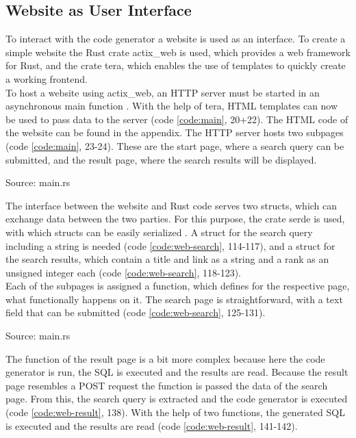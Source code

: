 \subsection{Website as User Interface}
To interact with the code generator a website is used as an interface. To create a simple website the Rust crate actix\_web is used, which provides a web framework for Rust, and the crate tera, which enables the use of templates to quickly create a working frontend.\\
To host a website using actix\_web, an HTTP server must be started in an asynchronous main function \parencite[cf.][n.p.]{ede_actix_2022}. With the help of tera, HTML templates can now be used \parencite[cf.][n.p.]{prouillet_tera_2022} to pass data to the server (code \ref{code:main}, 20+22). The HTML code of the website can be found in the appendix. The HTTP server hosts two subpages (code \ref{code:main}, 23-24). These are the start page, where a search query can be submitted, and the result page, where the search results will be displayed.
\begin{codeenv}
    \label{code:main}
    
    \centerline{Source: main.rs}
\end{codeenv}
The interface between the website and Rust code serves two structs, which can exchange data between the two parties. For this purpose, the crate serde is used, with which structs can be easily serialized \parencite[cf.][n.p.]{tolnay_serde_2017}. A struct for the search query including a string is needed (code \ref{code:web-search}, 114-117), and a struct for the search results, which contain a title and link as a string and a rank as an unsigned integer each (code \ref{code:web-search}, 118-123).\\
Each of the subpages is assigned a function, which defines for the respective page, what functionally happens on it. The search page is straightforward, with a text field that can be submitted (code \ref{code:web-search}, 125-131).
\begin{codeenv}
    \label{code:web-search}
    
    \centerline{Source: main.rs}
\end{codeenv}
The function of the result page is a bit more complex because here the code generator is run, the \ac{SQL} is executed and the results are read. Because the result page resembles a POST request the function is passed the data of the search page. From this, the search query is extracted and the code generator is executed (code \ref{code:web-result}, 138). With the help of two functions, the generated \ac{SQL} is executed and the results are read (code \ref{code:web-result}, 141-142).\\

